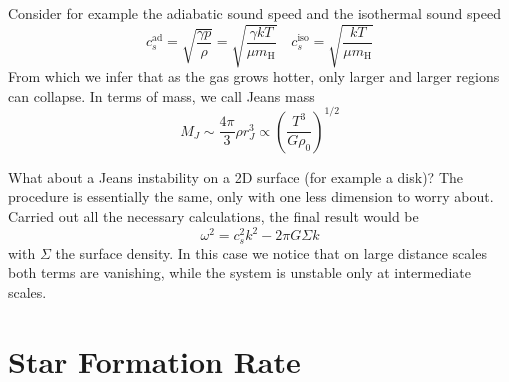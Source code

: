 \par Consider for example the adiabatic sound speed and the isothermal sound speed
\begin{equation*}
    c_{s}^{\text{ad}} = \sqrt{\frac{\gamma p }{\rho}} = \sqrt{\frac{\gamma kT}{\mu m_{\text{H}}}} \quad c_{s}^{\text{iso}} = \sqrt{\frac{kT}{\mu m_{\text{H}}}}
\end{equation*}
From which we infer that as the gas grows hotter, only larger and larger regions can collapse. In terms of mass, we call Jeans mass 
\begin{equation}
    M_{J} \sim \frac{4\pi}{3}\rho r_{J}^{3} \propto \left(\frac{T^{3}}{G \rho_{0}}\right)^{1/2}
    \label{eq:jeansmass}
\end{equation}
\par What about a Jeans instability on a 2D surface (for example a disk)? The procedure is essentially the same, only with one less dimension to worry about. Carried out all the necessary calculations, the final result would be
\begin{equation*}
    \omega^{2} = c_{s}^{2}k^{2} -2\pi G \Sigma k
\end{equation*}
with $\Sigma$ the surface density. In this case we notice that on large distance scales both terms are vanishing, while the system is unstable only at intermediate scales.

\section{Star Formation Rate}

